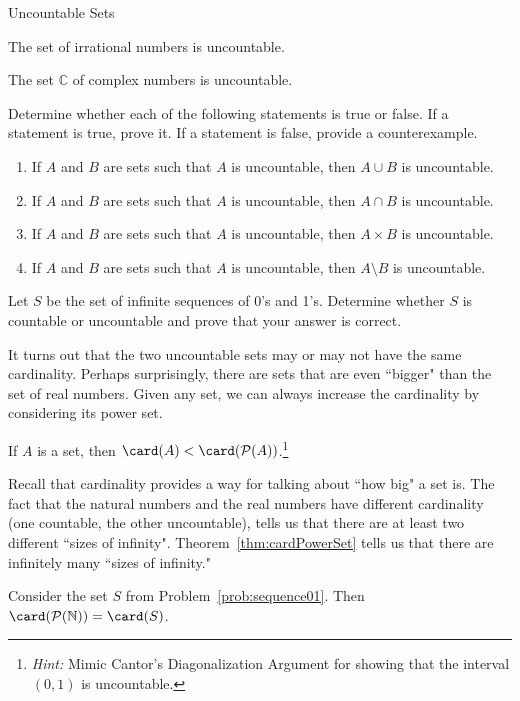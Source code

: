 \begin{section}{Uncountable Sets}
\begin{theorem}
The set of irrational numbers is uncountable.
\end{theorem}

\begin{theorem}
The set $\mathbb{C}$ of complex numbers is uncountable.
\end{theorem}

\begin{problem}
Determine whether each of the following statements is true or false. If a statement is true, prove it.  If a statement is false, provide a counterexample.
\begin{enumerate}[label=\textrm{(\alph*)}]
\item If $A$ and $B$ are sets such that $A$ is uncountable, then $A\cup B$ is uncountable.
\item If $A$ and $B$ are sets such that $A$ is uncountable, then $A\cap B$ is uncountable.
\item If $A$ and $B$ are sets such that $A$ is uncountable, then $A\times B$ is uncountable.
\item If $A$ and $B$ are sets such that $A$ is uncountable, then $A\setminus B$ is uncountable.
\end{enumerate}
\end{problem}

\begin{problem}\label{prob:sequence01} 
Let $S$ be the set of infinite sequences of 0's and 1's. Determine whether $S$ is countable or uncountable and prove that your answer is correct. 
\end{problem}

It turns out that the two uncountable sets may or may not have the same cardinality.  Perhaps surprisingly, there are sets that are even ``bigger" than the set of real numbers. Given any set, we can always increase the cardinality by considering its power set.

\begin{theorem}\label{thm:cardPowerSet}
If $A$ is a set, then $\card(A)<\card(\mathcal{P}(A))$.\footnote{\emph{Hint:} Mimic Cantor's Diagonalization Argument for showing that the interval $(0,1)$ is uncountable.}
\end{theorem}

Recall that cardinality provides a way for talking about ``how big" a set is. The fact that the natural numbers and the real numbers have different cardinality (one countable, the other uncountable), tells us that there are at least two different ``sizes of infinity".  Theorem~\ref{thm:cardPowerSet} tells us that there are infinitely many ``sizes of infinity."

\begin{theorem}
Consider the set $S$ from Problem~\ref{prob:sequence01}. Then $\card(\mathcal{P}(\mathbb{N}))=\card(S)$.
\end{theorem}

\end{section}